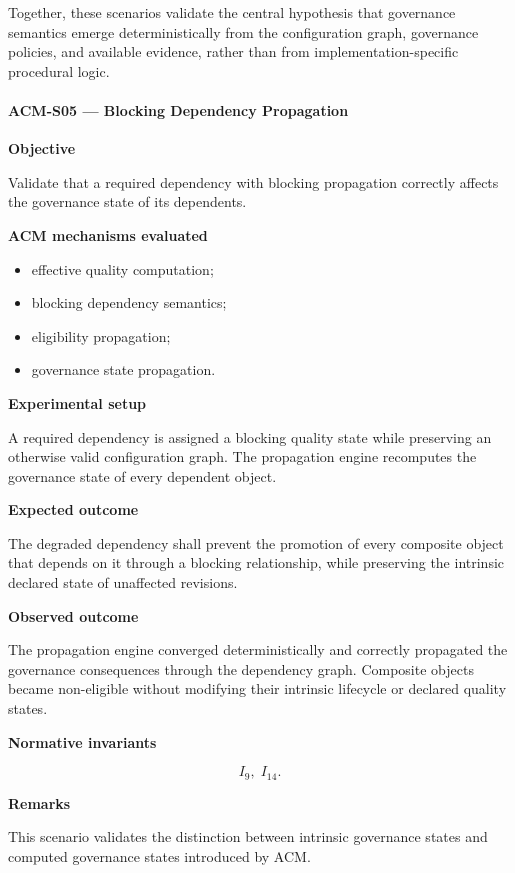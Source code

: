 \documentclass[10pt]{article}
\begin{document}
Together, these scenarios validate the central hypothesis that governance
semantics emerge deterministically from the configuration graph, governance
policies, and available evidence, rather than from implementation-specific
procedural logic.

\paragraph{ACM-S05 --- Blocking Dependency Propagation}

\textbf{Objective}

Validate that a required dependency with blocking propagation correctly affects
the governance state of its dependents.

\textbf{ACM mechanisms evaluated}

\begin{itemize}
    \item effective quality computation;
    \item blocking dependency semantics;
    \item eligibility propagation;
    \item governance state propagation.
\end{itemize}

\textbf{Experimental setup}

A required dependency is assigned a blocking quality state while preserving an
otherwise valid configuration graph. The propagation engine recomputes the
governance state of every dependent object.

\textbf{Expected outcome}

The degraded dependency shall prevent the promotion of every composite object
that depends on it through a blocking relationship, while preserving the
intrinsic declared state of unaffected revisions.

\textbf{Observed outcome}

The propagation engine converged deterministically and correctly propagated the
governance consequences through the dependency graph. Composite objects became
non-eligible without modifying their intrinsic lifecycle or declared quality
states.

\textbf{Normative invariants}

\[
I_9,\;
I_{14}.
\]

\textbf{Remarks}

This scenario validates the distinction between intrinsic governance states and
computed governance states introduced by ACM.
\end{document}
